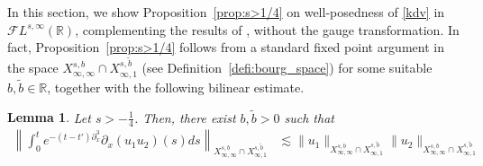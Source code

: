 \documentclass[%
11pt,  reqno]{amsart}
\newcommand{\5}{\textup{V}}
\newcommand{\FL}{\mathcal{F} L}
\newcommand{\les}{\lesssim}
\newcommand{\wt}{\widetilde}
\newtheorem{lemma}[theorem]{Lemma}
\theoremstyle{remark}
\newcommand{\R}{\mathbb{R}}
\numberwithin{equation}{section}
\numberwithin{theorem}{section}
\begin{document}
In this section, we show Proposition~\ref{prop:s>1/4} on well-posedness of \eqref{kdv}
 in $\FL^{s, \infty}(\R)$, complementing the results of \cite{Grunrock_ldv_hier}, without the gauge transformation. 
In fact, Proposition~\ref{prop:s>1/4} follows from a standard fixed point argument in the space $X^{s, b}_{\infty, \infty} \cap X^{s, \wt b }_{\infty, 1}$ (see Definition~\ref{defi:bourg_space}) for some  suitable $b,\wt b\in \R$,
together with the following bilinear estimate. 



\begin{lemma}\label{LEM:bil0}
Let $s>-\frac14$. Then, there exist $b,\wt b >0 $ 
 such that 
\begin{align}
\label{bilinear0}
\left\|\int_0^te^{-(t-t')\partial_x^3}\partial_x(u_1u_2) (s)ds\right\|_{X^{s,b}_{\infty, \infty}\cap X^{s,\tilde{b}}_{\infty, 1} } & \les 
\|u_1\|_{X^{s,b}_{\infty, \infty}\cap X^{s,\tilde{b}}_{\infty, 1} }
\|u_2\|_{X^{s,b}_{\infty, \infty}\cap X^{s,\tilde{b}}_{\infty, 1} }
\end{align}
\end{lemma}
\end{document}
